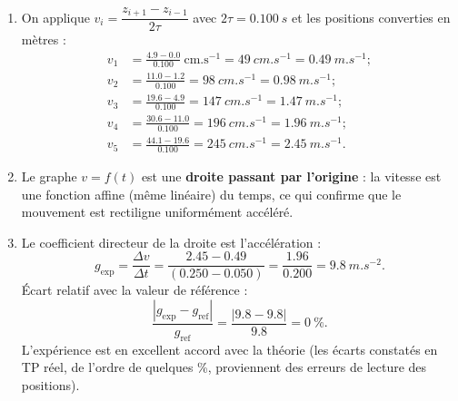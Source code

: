 \documentclass[11pt]{article}
\newcommand{\cle}[1]{{\popxbold\color{popdark}#1}}
\begin{document}
\begin{corrige}
\begin{enumerate}
\item On applique $v_i = \dfrac{z_{i+1}-z_{i-1}}{2\tau}$ avec $2\tau = \SI{0,100}{s}$ et les positions converties en mètres :
\begin{align*}
v_1 &= \frac{\num{4,9}-\num{0,0}}{\num{0,100}}\ \mathrm{cm.s^{-1}} = \SI{49}{cm.s^{-1}} = \SI{0,49}{m.s^{-1}} ;\\
v_2 &= \frac{\num{11,0}-\num{1,2}}{\num{0,100}} = \SI{98}{cm.s^{-1}} = \SI{0,98}{m.s^{-1}} ;\\
v_3 &= \frac{\num{19,6}-\num{4,9}}{\num{0,100}} = \SI{147}{cm.s^{-1}} = \SI{1,47}{m.s^{-1}} ;\\
v_4 &= \frac{\num{30,6}-\num{11,0}}{\num{0,100}} = \SI{196}{cm.s^{-1}} = \SI{1,96}{m.s^{-1}} ;\\
v_5 &= \frac{\num{44,1}-\num{19,6}}{\num{0,100}} = \SI{245}{cm.s^{-1}} = \SI{2,45}{m.s^{-1}}.
\end{align*}
\item Le graphe $v = f(t)$ est une \textbf{droite passant par l'origine} : la vitesse est une fonction affine (même linéaire) du temps, ce qui confirme que le mouvement est \cle{rectiligne uniformément accéléré}.
\item Le coefficient directeur de la droite est l'accélération :
\[ g_{\mathrm{exp}} = \frac{\Delta v}{\Delta t} = \frac{\num{2,45} - \num{0,49}}{(\num{0,250} - \num{0,050})} = \frac{\num{1,96}}{\num{0,200}} = \SI{9,8}{m.s^{-2}}. \]
Écart relatif avec la valeur de référence :
\[ \frac{|g_{\mathrm{exp}} - g_{\mathrm{ref}}|}{g_{\mathrm{ref}}} = \frac{|\num{9,8} - \num{9,8}|}{\num{9,8}} = 0\ \%. \]
L'expérience est en excellent accord avec la théorie (les écarts constatés en TP réel, de l'ordre de quelques \%, proviennent des erreurs de lecture des positions).
\end{enumerate}
\end{corrige}
\end{document}

